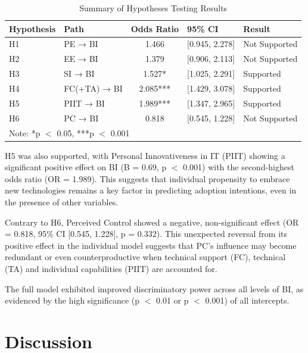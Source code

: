 \documentclass[twocolumn]{article}
\begin{document}
\begin{table}[ht]
\centering
\caption{Summary of Hypotheses Testing Results}
\label{tab:hypotheses}
\begin{tabular}{llcll}
\hline
Hypothesis & Path & Odds Ratio & 95\% CI & Result \\
\hline
H1 & PE → BI & 1.466 & [0.945, 2.278] & Not Supported \\
H2 & EE → BI & 1.379 & [0.906, 2.113] & Not Supported \\
H3 & SI → BI & 1.527* & [1.025, 2.291] & Supported \\
H4 & FC(+TA) → BI & 2.085*** & [1.429, 3.078] & Supported \\
H5 & PIIT → BI & 1.989*** & [1.347, 2.965] & Supported \\
H6 & PC → BI & 0.818 & [0.545, 1.228] & Not Supported \\
\hline
\multicolumn{5}{l}{\small Note: *p $<$ 0.05, ***p $<$ 0.001} \\
\end{tabular}
\end{table}

H5 was also supported, with Personal Innovativeness in IT (PIIT) showing a significant positive effect on BI (B = 0.69, p $<$ 0.001) with the second-highest odds ratio (OR = 1.989). This suggests that individual propensity to embrace new technologies remains a key factor in predicting adoption intentions, even in the presence of other variables.

Contrary to H6, Perceived Control showed a negative, non-significant effect (OR = 0.818, 95\% CI [0.545, 1.228], p = 0.332). This unexpected reversal from its positive effect in the individual model suggests that PC's influence may become redundant or even counterproductive when technical support (FC), technical (TA) and individual capabilities (PIIT) are accounted for.

The full model exhibited improved discriminatory power across all levels of BI, as evidenced by the high significance (p $<$ 0.01 or p $<$ 0.001) of all intercepts.



\section{Discussion}
\end{document}
